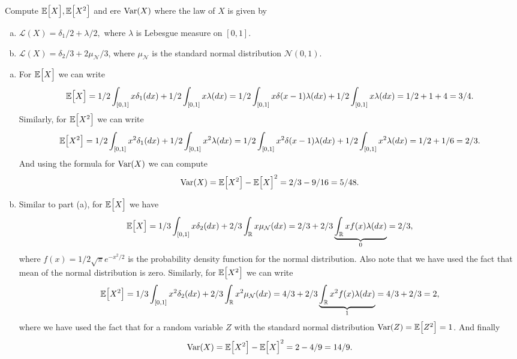\begin{problem}
	Compute $ \mathbb{E}\big[X\big],\mathbb{E}\big[X^2\big] $ and ere $ \operatorname{Var}(X) $ where the law of $ X $ is given by
	\begin{enumerate}[(a)]
		\item $ \mathcal{L}(X) = \delta_1/2 + \lambda/2, $ where $ \lambda $ is Lebesgue measure on $ [0,1] $.
		\item $ \mathcal{L}(X) = \delta_2/3 + 2\mu_\mathcal{N}/3 $, where $ \mu_\mathcal{N} $ is the standard normal distribution $ \mathcal{N}(0,1) $.
	\end{enumerate}
\end{problem}
\begin{solution}
	\begin{enumerate}[(a)]
		\item For $ \mathbb{E}\big[X\big] $ we can write
		\[ \mathbb{E}\big[X\big] = 1/2\int_{[0,1]}x\delta_1(dx) + 1/2\int_{[0,1]}x\lambda(dx) = 1/2\int_{[0,1]} x\delta(x-1)\lambda(dx) + 1/2\int_{[0,1]}x\lambda(dx) = 1/2+1+4 = 3/4.  \]
		Similarly, for $ \mathbb{E}\big[X^2\big] $ we can write
		\[ \mathbb{E}\big[X^2\big] = 1/2\int_{[0,1]}x^2\delta_1(dx) + 1/2\int_{[0,1]}x^2\lambda(dx) = 1/2\int_{[0,1]} x^2\delta(x-1)\lambda(dx) + 1/2\int_{[0,1]}x^2\lambda(dx) = 1/2 + 1/6 = 2/3. \]
		And using the formula for $ \operatorname{Var}(X) $ we can compute
		\[ \operatorname{Var}(X) = \mathbb{E}\big[X^2\big] - \mathbb{E}\big[X\big]^2 = 2/3 - 9/16 = 5/48. \]
		\item Similar to part (a), for $ \mathbb{E}\big[X\big] $ we have
		\[ \mathbb{E}\big[X\big] = 1/3\int_{[0,1]} x\delta_2(dx) + 2/3\int_{\mathbb{R}} x\mu_\mathcal{N}(dx) = 2/3 + 2/3\underbrace{\int_{\mathbb{R}} xf(x)\lambda(dx)}_{0} = 2/3, \]
		where $ f(x)=1/2\sqrt{\pi}e^{-x^2/2} $ is the probability density function for the normal distribution. Also note that we have used the fact that mean of the normal distribution is zero. Similarly, for $ \mathbb{E}\big[X^2\big] $ we can write
		\[ \mathbb{E}\big[X^2\big] = 1/3\int_{[0,1]} x^2\delta_2(dx) + 2/3\int_{\mathbb{R}} x^2\mu_\mathcal{N}(dx) = 4/3 + 2/3\underbrace{\int_{\mathbb{R}} x^2f(x) \lambda(dx)}_{1} = 4/3 + 2/3 = 2,  \]
		where we have used the fact that for a random variable $ Z $ with the standard normal distribution $ \operatorname{Var}(Z) = \mathbb{E}\big[Z^2\big] = 1 $. And finally
		\[ \operatorname{Var}(X) = \mathbb{E}\big[X^2\big] - \mathbb{E}\big[X\big]^2 = 2 - 4/9 = 14/9. \] 
	\end{enumerate}

\end{solution}

